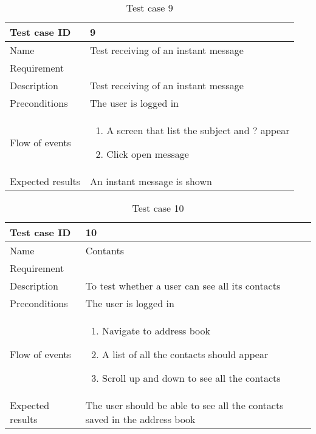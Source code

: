 \begin{table}
\begin{tabular}{l|p{10cm}}
Test case ID & 9 \\ \hline
Name & Test receiving of an instant message\\ \hline
Requirement & \\ \hline
Description & Test receiving of an instant message\\ \hline
Preconditions & The user is logged in\\ \hline
Flow of events & 
\begin{enumerate}
\item{}A screen that list the subject and ? appear
\item{}Click open message
\end{enumerate} \\ \hline
Expected results & An instant message is shown
\end{tabular}
\caption{Test case 9} \label{tab:case9}
\end{table}

\begin{table}
\begin{tabular}{l|p{10cm}}
Test case ID & 10 \\ \hline
Name & Contants\\ \hline
Requirement & \\ \hline
Description & To test whether a user can see all its contacts\\ \hline
Preconditions & The user is logged in\\ \hline
Flow of events & 
\begin{enumerate}
\item{}Navigate to address book
\item{}A list of all the contacts should appear
\item{}Scroll up and down to see all the contacts
\end{enumerate} \\ \hline
Expected results & The user should be able to see all the contacts saved in the address book
\end{tabular}
\caption{Test case 10} \label{tab:case10}
\end{table}

